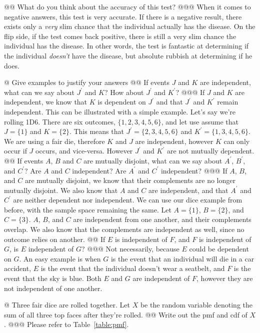 \documentclass[10pt]{article}
\begin{document}
\begin{easylist}[enumerate]
    @@ What do you think about the accuracy of this test?
    @@@ When it comes to negative answers, this test is very accurate. If there is a negative result, there exists only
    a \textit{very} slim chance that the individual actually has the disease. On the flip side, if the test comes back
    positive, there is still a very slim chance the individual has the disease. In other words, the test is fantastic at
    determining if the individual \textit{doesn't} have the disease, but absolute rubbish at determining if he does.

    @ Give examples to justify your answers
    @@ If events $J$ and $K$ are independent, what can we say about $J^\prime$ and $K$? How about $J^\prime$ and
    $K^\prime$?
    @@@ If $J$ and $K$ are independent, we know that $K$ is dependent on $J^\prime$ and that $J^\prime$ and $K^\prime$
    remain independent. This can be illustrated with a simple example.  Let's say we're rolling 1D6. There are six
    outcomes, $\{1, 2, 3, 4, 5, 6\}$, and let use assume that $J=\{1\}$ and $K=\{2\}$. This means that $J^\prime=\{2, 3,
    4, 5, 6\}$ and $K^\prime = \{1, 3, 4, 5, 6\}$. We are using a fair die, therefore $K$ and $J$ are independent,
    however $K$ can only occur if $J$ occurs, and vice-versa. However $J^\prime$ and $K^\prime$ are not mutually
    dependent.
    @@ If events $A$, $B$ and $C$ are mutually disjoint, what can we say about $A^\prime$, $B^\prime$, and $C^\prime$?
    Are $A$ and $C$ independent? Are $A^\prime$ and $C^\prime$ independent?
    @@@ If $A$, $B$, and $C$ are mutually disjoint, we know that their complements are no longer mutually disjoint. We
    also know that $A$ and $C$ are independent, and that $A^\prime$ and $C^\prime$ are neither dependent nor
    independent. We can use our dice example from before, with the sample space remaining the same. Let $A = \{1\}$,
    $B=\{2\}$, and $C=\{3\}$. $A$, $B$, and $C$ are independent from one another, and their complements overlap. We also
    know that the complements are independent as well, since no outcome relies on another.
    @@ If $E$ is independent of $F$, and $F$ is independent of $G$, is $E$ independent of $G$?
    @@@ Not necessarily, because $E$ could be dependent on $G$. An easy example is when $G$ is the event that an
    individual will die in a car accident, $E$ is the event that the individual doesn't wear a seatbelt, and $F$ is the
    event that the sky is blue. Both $E$ and $G$ are independent of $F$, however they are not independent of one
    another.

    @ Three fair dice are rolled together. Let $X$ be the random variable denoting the sum of all three top faces after
    they're rolled.
    @@ Write out the pmf and cdf of $X$.
    @@@ Please refer to Table~\ref{table:pmf}.


\end{easylist}
\end{document}
